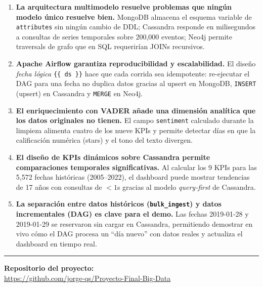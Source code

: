 \documentclass[12pt,a4paper]{article}
\begin{document}
\begin{enumerate}

\item \textbf{La arquitectura multimodelo resuelve problemas que ningún modelo único resuelve bien.}
MongoDB almacena el esquema variable de \texttt{attributes} sin ningún cambio de DDL;
Cassandra responde en milisegundos a consultas de series temporales sobre 200,000 eventos;
Neo4j permite traversals de grafo que en SQL requerirían JOINs recursivos.

\item \textbf{Apache Airflow garantiza reproducibilidad y escalabilidad.}
El diseño \textit{fecha lógica} \texttt{\{\{ ds \}\}} hace que cada corrida sea idempotente:
re-ejecutar el DAG para una fecha no duplica datos gracias al upsert en MongoDB,
\texttt{INSERT} (upsert) en Cassandra y \texttt{MERGE} en Neo4j.

\item \textbf{El enriquecimiento con VADER añade una dimensión analítica que los datos originales no tienen.}
El campo \texttt{sentiment} calculado durante la limpieza alimenta cuatro de los nueve KPIs
y permite detectar días en que la calificación numérica (stars) y el tono del texto divergen.

\item \textbf{El diseño de KPIs dinámicos sobre Cassandra permite comparaciones temporales significativas.}
Al calcular los 9 KPIs para las 5,572 fechas históricas (2005--2022), el dashboard puede
mostrar tendencias de 17 años con consultas de $< 1$s gracias al modelo \textit{query-first}
de Cassandra.

\item \textbf{La separación entre datos históricos (\texttt{bulk\_ingest}) y datos incrementales (DAG)
es clave para el demo.} Las fechas 2019-01-28 y 2019-01-29 se reservaron sin cargar en
Cassandra, permitiendo demostrar en vivo cómo el DAG procesa un ``día nuevo'' con datos
reales y actualiza el dashboard en tiempo real.

\end{enumerate}

\vspace{1.5cm}

\noindent\rule{\linewidth}{1pt}

\vspace{0.4cm}
\noindent\textbf{Repositorio del proyecto:}\\[0.3em]
\noindent\url{https://github.com/jorge-qs/Proyecto-Final-Big-Data}

\vspace{0.3cm}
\end{document}
